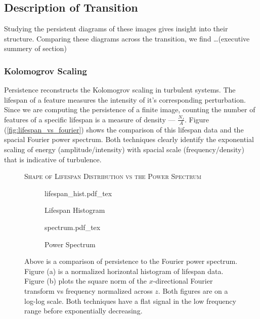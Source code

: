 \documentclass[pdflatex,sn-aps]{sn-jnl}%
\newcommand{\incfig}[1]{%
    \def\svgwidth{\columnwidth}
    {#1.pdf_tex}
}
\theoremstyle{thmstyleone}%
\theoremstyle{thmstyletwo}%
\theoremstyle{thmstylethree}%
\begin{document}
\subsection{Description of Transition}\label{res:description}

    \par
    Studying the persistent diagrams of these images gives insight into their structure.  Comparing these diagrams across the transition, we find \ldots (executive summery of section)

\subsubsection{Kolomogrov Scaling}

    \par
    Persistence reconstructs the Kolomogrov scaling in turbulent systems.  The lifespan of a feature measures the intensity of it's corresponding perturbation.  Since we are computing the persistence of a finite image, counting the number of features of a specific lifespan is a measure of density --- $\frac{N_f}{A}$.  Figure (\ref{fig:lifespan_vs_fourier}) shows the comparison of this lifespan data and the spacial Fourier power spectrum.  Both techniques clearly identify the exponential scaling of energy (amplitude/intensity) with spacial scale (frequency/density) that is indicative of turbulence.  
    \begin{figure}[h]
        \centering
        \textsc{Shape of Lifespan Distribution vs the Power Spectrum}\\
        \vspace{0.2cm}
        \begin{subfigure}{0.45\textwidth}
            \centering
            \incfig{lifespan_hist}
            \caption{\footnotesize Lifespan Histogram}\label{fig:lifespan_hist}
        \end{subfigure}
            \begin{subfigure}{0.45\textwidth}
            \centering
            \incfig{spectrum}
            \caption{\footnotesize Power Spectrum}\label{fig:power_spectra}
            \end{subfigure}
        \caption{Above is a comparison of persistence to the Fourier power spectrum.  Figure (a) is a normalized horizontal histogram of lifespan data.  Figure (b) plots the square norm of the $x$-directional Fourier transform vs frequency normalized across $z$.  Both figures are on a log-log scale.  Both techniques have a flat signal in the low frequency range before exponentially decreasing.  }%
        \label{fig:lifespan_comparison}
    \end{figure}
\end{document}
